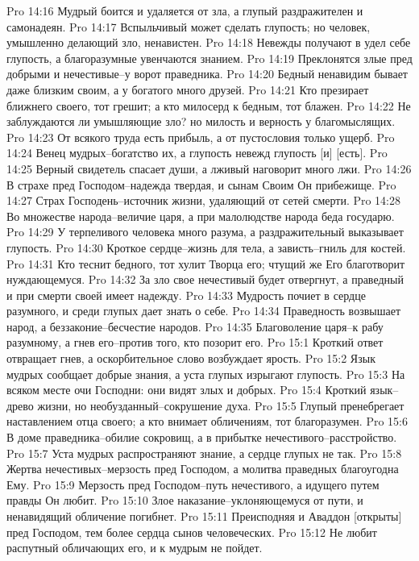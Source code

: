 Pro 14:16  Мудрый боится и удаляется от зла, а глупый раздражителен и самонадеян.
Pro 14:17  Вспыльчивый может сделать глупость; но человек, умышленно делающий зло, ненавистен.
Pro 14:18  Невежды получают в удел себе глупость, а благоразумные увенчаются знанием.
Pro 14:19  Преклонятся злые пред добрыми и нечестивые--у ворот праведника.
Pro 14:20  Бедный ненавидим бывает даже близким своим, а у богатого много друзей.
Pro 14:21  Кто презирает ближнего своего, тот грешит; а кто милосерд к бедным, тот блажен.
Pro 14:22  Не заблуждаются ли умышляющие зло? но милость и верность у благомыслящих.
Pro 14:23  От всякого труда есть прибыль, а от пустословия только ущерб.
Pro 14:24  Венец мудрых--богатство их, а глупость невежд глупость [и] [есть].
Pro 14:25  Верный свидетель спасает души, а лживый наговорит много лжи.
Pro 14:26  В страхе пред Господом--надежда твердая, и сынам Своим Он прибежище.
Pro 14:27  Страх Господень--источник жизни, удаляющий от сетей смерти.
Pro 14:28  Во множестве народа--величие царя, а при малолюдстве народа беда государю.
Pro 14:29  У терпеливого человека много разума, а раздражительный выказывает глупость.
Pro 14:30  Кроткое сердце--жизнь для тела, а зависть--гниль для костей.
Pro 14:31  Кто теснит бедного, тот хулит Творца его; чтущий же Его благотворит нуждающемуся.
Pro 14:32  За зло свое нечестивый будет отвергнут, а праведный и при смерти своей имеет надежду.
Pro 14:33  Мудрость почиет в сердце разумного, и среди глупых дает знать о себе.
Pro 14:34  Праведность возвышает народ, а беззаконие--бесчестие народов.
Pro 14:35  Благоволение царя--к рабу разумному, а гнев его--против того, кто позорит его.
Pro 15:1  Кроткий ответ отвращает гнев, а оскорбительное слово возбуждает ярость.
Pro 15:2  Язык мудрых сообщает добрые знания, а уста глупых изрыгают глупость.
Pro 15:3  На всяком месте очи Господни: они видят злых и добрых.
Pro 15:4  Кроткий язык--древо жизни, но необузданный--сокрушение духа.
Pro 15:5  Глупый пренебрегает наставлением отца своего; а кто внимает обличениям, тот благоразумен.
Pro 15:6  В доме праведника--обилие сокровищ, а в прибытке нечестивого--расстройство.
Pro 15:7  Уста мудрых распространяют знание, а сердце глупых не так.
Pro 15:8  Жертва нечестивых--мерзость пред Господом, а молитва праведных благоугодна Ему.
Pro 15:9  Мерзость пред Господом--путь нечестивого, а идущего путем правды Он любит.
Pro 15:10  Злое наказание--уклоняющемуся от пути, и ненавидящий обличение погибнет.
Pro 15:11  Преисподняя и Аваддон [открыты] пред Господом, тем более сердца сынов человеческих.
Pro 15:12  Не любит распутный обличающих его, и к мудрым не пойдет.
